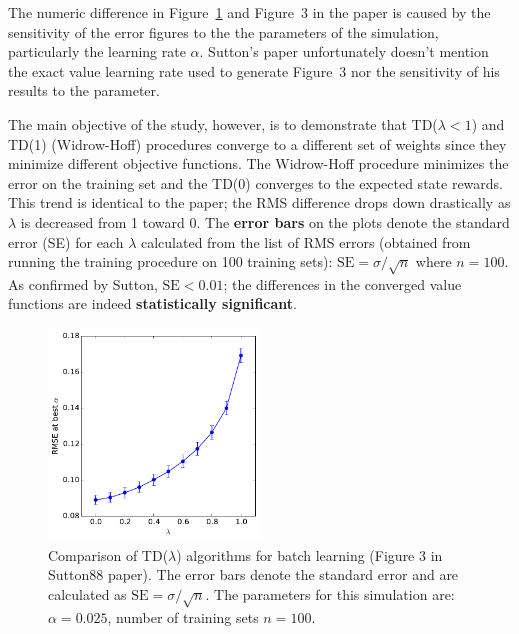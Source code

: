 \documentclass[conference]{IEEEtran}
\begin{document}
The numeric difference in Figure~\ref{fig:expt1} and Figure~3 in the paper is caused by the sensitivity of the error figures to the the parameters of the simulation, particularly the learning rate $\alpha$. Sutton's paper unfortunately doesn't mention the exact value learning rate used to generate Figure~3 nor the sensitivity of his results to the parameter. 

The main objective of the study, however, is to demonstrate that TD($\lambda<1$) and TD(1) (Widrow-Hoff) procedures converge to a different set of weights since they minimize different objective functions. The Widrow-Hoff procedure minimizes the error on the training set and the TD(0) converges to the expected state rewards. This trend is identical to the paper; the RMS difference drops down drastically as $\lambda$ is decreased from 1 toward 0. The {\bf error bars} on the plots denote the standard error (SE) for each $\lambda$ calculated from the list of RMS errors (obtained from running the training procedure on 100 training sets): $\text{SE} = \sigma/\sqrt{n}$ where $n = 100$. As confirmed by Sutton, $\text{SE}<0.01$; the differences in the converged value functions are indeed {\bf statistically significant}.
\begin{figure}[!bt]
\includegraphics[width=0.5\textwidth]{./figures/fig3.pdf}
\caption{Comparison of TD($\lambda$) algorithms for batch learning (Figure 3 in Sutton88 paper). The error bars denote the standard error and are calculated as $\text{SE} = \sigma/\sqrt{n}$. The parameters for this simulation are: $\alpha = 0.025$, number of training sets $n = 100$.\label{fig:expt1}}
\end{figure}
\end{document}
